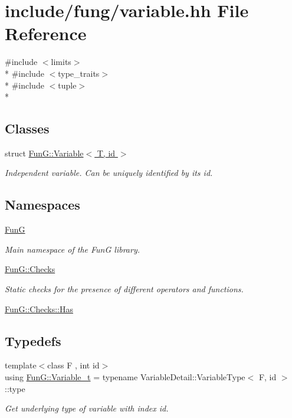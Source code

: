 \hypertarget{variable_8hh}{\section{include/fung/variable.hh File Reference}
\label{variable_8hh}
}
{\ttfamily \#include $<$limits$>$}\\*
{\ttfamily \#include $<$type\-\_\-traits$>$}\\*
{\ttfamily \#include $<$tuple$>$}\\*
\subsection*{Classes}
\begin{DoxyCompactItemize}
\item 
struct \hyperlink{structFunG_1_1Variable}{Fun\-G\-::\-Variable$<$ T, id $>$}
\begin{DoxyCompactList}\small\item\em Independent variable. Can be uniquely identified by its id. \end{DoxyCompactList}\end{DoxyCompactItemize}
\subsection*{Namespaces}
\begin{DoxyCompactItemize}
\item 
\hyperlink{namespaceFunG}{Fun\-G}
\begin{DoxyCompactList}\small\item\em Main namespace of the Fun\-G library. \end{DoxyCompactList}\item 
\hyperlink{namespaceFunG_1_1Checks}{Fun\-G\-::\-Checks}
\begin{DoxyCompactList}\small\item\em Static checks for the presence of different operators and functions. \end{DoxyCompactList}\item 
\hyperlink{namespaceFunG_1_1Checks_1_1Has}{Fun\-G\-::\-Checks\-::\-Has}
\end{DoxyCompactItemize}
\subsection*{Typedefs}
\begin{DoxyCompactItemize}
\item 
{\footnotesize template$<$class F , int id$>$ }\\using \hyperlink{namespaceFunG_afc90c0241d79dc4e02ffe640816ec94f}{Fun\-G\-::\-Variable\-\_\-t} = typename Variable\-Detail\-::\-Variable\-Type$<$ F, id $>$\-::type
\begin{DoxyCompactList}\small\item\em Get underlying type of variable with index id. \end{DoxyCompactList}\end{DoxyCompactItemize}
